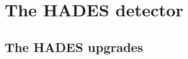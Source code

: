 \chapter{The HADES detector}
\label{chapter:detector}
\section{The HADES upgrades}
\label{chapter:HADES_upgrades}